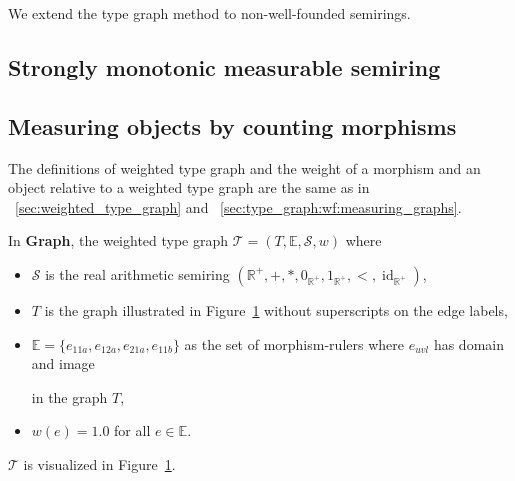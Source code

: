 We extend the type graph method to non-well-founded semirings.
\subsection{Strongly monotonic measurable semiring}
\label{sec:strongly_monotonic_measurable_semiring}

\subsection{Measuring objects by counting morphisms}
The definitions of weighted type graph and the weight of a morphism and an object relative to a weighted type graph are the same as in \textsection~\ref{sec:weighted_type_graph} and \textsection~\ref{sec:type_graph:wf:measuring_graphs}.
\begin{example}
    \label{nwf:example:weighted_type_graph}
     In \textbf{Graph}, the weighted type graph $\mathcal{T} = (T, \mathbb{E}, \mathcal{S}, w)$ where
     \begin{itemize}
        \item $\mathcal{S}$ is the real arithmetic semiring $(\mathbb{R}^+, +, *, 0_{\mathbb{R}^+}, 1_{\mathbb{R}^+}, <, \operatorname{id}_{\mathbb{R}^+})$,
        \item $T$ is the graph illustrated in Figure~\ref{fig:nwf:weighted_type_graph_sss} without superscripts on the edge labels,
        \item $\mathbb{E}=\{e_{11a},e_{12a},e_{21a},e_{11b}\}$ as the set of morphism-rulers where 
     $e_{uvl}$ has domain 
      and image 
     in the graph $T$,
    \item $w(e) = 1.0$ for all $e \in \mathbb{E}$.
     \end{itemize} 
\noindent $\mathcal{T}$ is visualized in Figure~\ref{fig:nwf:weighted_type_graph_sss}.
    \begin{figure}[H] 
        \centering
        \caption{}
        \label{fig:nwf:weighted_type_graph_sss}
    \end{figure}
\end{example}

